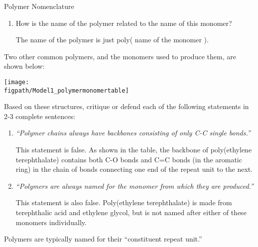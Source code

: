\begin{activity}{Polymer Nomenclature}
\begin{ctqs}
\begin{enumerate}
			\item How is the name of the polymer related to the name of this monomer?
			
				\begin{solution}[0.5in]
				
					The name of the polymer is just poly( name of the monomer ).
					
				\end{solution}
				
		\end{enumerate}
		
	\question Two other common polymers, and the monomers used to produce them, are shown below:
	
		\centerline{\texttt{[image: \\figpath/Model1\_polymermonomertable]}}
		
		Based on these structures, critique or defend each of the following statements in 2-3 complete sentences:
		
		\begin{enumerate}
			\item \emph{``Polymer chains always have backbones consisting of only C-C single bonds.''}
			
				\begin{solution}[1.5in]
					This statement is false.  As shown in the table, the backbone of poly(ethylene terephthalate) contains both C-O bonds and C=C bonds (in the aromatic ring) in the chain of bonds connecting one end of the repeat unit to the next.
				\end{solution}
			
			\item \emph{``Polymers are always named for the monomer from which they are produced.''}
			
				\begin{solution}[1.5in]
					This statement is also false.  Poly(ethylene terephthalate) is made from terephthalic acid and ethylene glycol, but is not named after either of these monomers individually.
				\end{solution}
			
		\end{enumerate}

\end{ctqs}

\begin{infobox}
	Polymers are typically named for their ``constituent repeat unit.''
\end{infobox}

\begin{ctqs}


\end{ctqs}
\end{activity}
